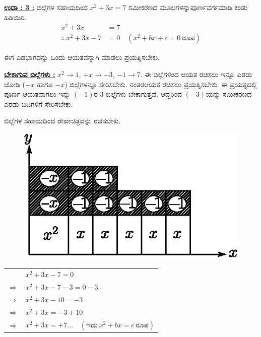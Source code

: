 \medskip

\noindent
{\textbf{\underline{ಉದಾ : 3 :}}} ಬಿಲ್ಲೆಗಳ ಸಹಾಯದಿಂದ $x^2 + 3x = 7$ ಸಮೀಕರಣದ ಮೂಲಗಳನ್ನು\break ಪೂರ್ಣವರ್ಗಮಾಡಿ ಕಂಡು ಹಿಡಿಯಿರಿ. 
\begin{align*}
x^2 + 3x &= 7\\
\therefore~ x^2 + 3x - 7 & = 0 \quad (x^2 + bx + c = 0~\text{ರೂಪ})
\end{align*}

ಈಗ ಎಡಭಾಗವನ್ನು ಒಂದು ಆಯತವನ್ನಾಗಿ ಮಾಡಲು ಪ್ರಯತ್ನಿಸಬೇಕು.

\medskip

\noindent
{\textbf{\underline{ಬೇಕಾಗುವ ಬಿಲ್ಲೆಗಳು :}}} $x^2 \rightarrow 1$, $+x \rightarrow -3$, $-1 \rightarrow 7$. ಈ ಬಿಲ್ಲೆಗಳಿಂದ ಆಯತ ರಚಿಸಲು ಇನ್ನೂ ಎರಡು ಜೋಡಿ ($+x$ ಹಾಗೂ $-x$) ಬಿಲ್ಲೆಗಳನ್ನೂ ಸೇರಿಸಬೇಕು. ನಂತರ\break ಆಯತ ರಚಿಸಲು ಪ್ರಯತ್ನಿಸಬೇಕು. ಈ ಪ್ರಯತ್ನದಲ್ಲಿ ಪೂರ್ಣ ಆಯತವಾಗಲು ಇನ್ನು $(-1)$ರ 3 ಬಿಲ್ಲೆಗಳು ಬೇಕಾಗುತ್ತವೆ. ಆದ್ದರಿಂದ $(-3)$ಯನ್ನು ಸಮೀಕರಣದ ಎರಡು ಬದಿಗಳಿಗೆ ಸೇರಿಸಬೇಕು.


ಬಿಲ್ಲೆಗಳ ಸಹಾಯದಿಂದ ರೇಖಾಚಿತ್ರವನ್ನು ರಚಿಸಬೇಕು.

\newpage

\begin{figure}[H]
\centering
\includegraphics[scale=0.8]{src/figure/chap3/fig3-49.eps}
\end{figure} 

\begin{tabular}{ll}
& $x^2 + 3x - 7 = 0$\\
$\Rightarrow$ & $x^2 + 3x - 7 - 3 = 0 - 3$\\
$\Rightarrow$ & $x^2 + 3x - 10 = -3$\\
$\Rightarrow$ & $x^2 + 3x = -3 + 10$\\
$\Rightarrow$ & $x^2 + 3x = +7 \hdots\quad (\text{ಇದು}~ x^2 + bx = c ~\text{ರೂಪ})$
\end{tabular}

